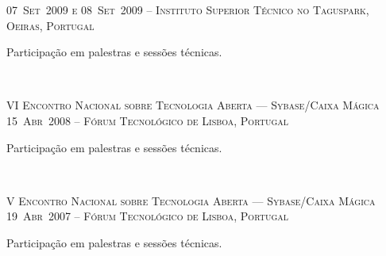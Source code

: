 \documentclass[a4paper,fontsize=10pt]{scrartcl} %
\begin{document}
\begin{minipage}[t]{0.46\textwidth}
\small\textsc{07~Set~2009 e 08~Set~2009 -- Instituto Superior Técnico no Taguspark, Oeiras, Portugal}\\ \normalsize
 \begin{inparaitem}
  	\item[] Participação em palestras e sessões técnicas.
 \end{inparaitem}
\\\par
\textsc{VI Encontro Nacional sobre Tecnologia Aberta --- Sybase/Caixa Mágica}\\
\small\textsc{15~Abr~2008 -- Fórum Tecnológico de Lisboa, Portugal}\\ \normalsize
\begin{inparaitem}
 	\item[] Participação em palestras e sessões técnicas.
 \end{inparaitem}
\\\par
\textsc{V Encontro Nacional sobre Tecnologia Aberta --- Sybase/Caixa Mágica}\\
\small\textsc{19~Abr~2007 -- Fórum Tecnológico de Lisboa, Portugal}\\ \normalsize
\begin{inparaitem}
 	\item[] Participação em palestras e sessões técnicas.
 \end{inparaitem}
\\\par
\end{minipage} %
\end{document}
